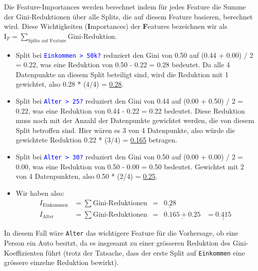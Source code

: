 \begin{myexample}
    Die Feature-Importances werden berechnet indem für jedes Feature die Summe der Gini-Reduktionen über alle Splits, die auf diesem Feature basieren, berechnet wird. Diese Wichtigkeiten (\textbf{I}mportances) der \textbf{F}eatures bezeichnen wir als $\text{I}_F = \sum_{\text{Splits auf Feature}} \text{Gini-Reduktion}$.
    \begin{itemize}
        \item Split bei \textcolor{blue}{\texttt{Einkommen > 50k?}} reduziert den Gini von 0.50 auf (0.44 + 0.00) / 2 = 0.22, was eine Reduktion von 0.50 - 0.22 = 0.28 bedeutet. Da alle 4 Datenpunkte an diesem Split beteiligt sind, wird die Reduktion mit 1 gewichtet, also 0.28 * (4/4) = \underline{0.28}.
        \item Split bei \textcolor{blue}{\texttt{Alter > 25?}} reduziert den Gini von 0.44 auf (0.00 + 0.50) / 2 = 0.22, was eine Reduktion von 0.44 - 0.22 = 0.22 bedeutet. Diese Reduktion muss noch mit der Anzahl der Datenpunkte gewichtet werden, die von diesem Split betroffen sind. Hier wären es 3 von 4 Datenpunkte, also würde die gewichtete Reduktion 0.22 * (3/4) = \underline{0.165} betragen.
        \item Split bei \textcolor{blue}{\texttt{Alter > 30?}} reduziert den Gini von 0.50 auf (0.00 + 0.00) / 2 = 0.00, was eine Reduktion von 0.50 - 0.00 = 0.50 bedeutet. Gewichtet mit 2 von 4 Datenpunkten, also 0.50 * (2/4) = \underline{0.25}.
        \item Wir haben also:
              \[
                  \begin{aligned}
                      I_\text{Einkommen} & = \sum \text{Gini-Reduktionen} & = & \underline{\underline{0.28}} &                                 \\
                      I_\text{Alter}     & = \sum \text{Gini-Reduktionen} & = & \underline{0.165 + 0.25}     & = \underline{\underline{0.415}}
                  \end{aligned}
              \]
    \end{itemize}
    In diesem Fall wäre \texttt{Alter} das wichtigere Feature für die Vorhersage, ob eine Person ein Auto besitzt, da es insgesamt zu einer grösseren Reduktion des Gini-Koeffizienten führt (trotz der Tatsache, dass der erste Split auf \texttt{Einkommen} eine grössere einzelne Reduktion bewirkt).
\end{myexample}

